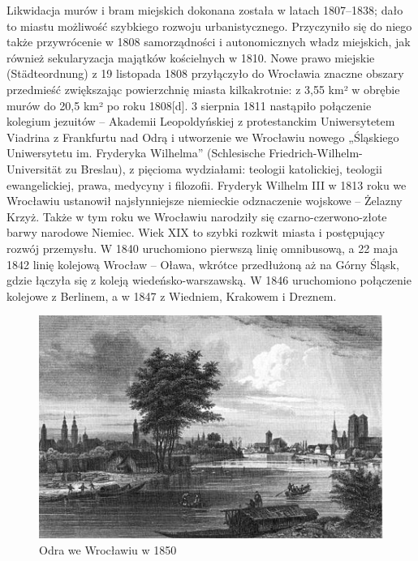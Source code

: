 \documentclass{article}
\begin{document}
Likwidacja murów i bram miejskich dokonana została w latach 1807–1838; dało to miastu możliwość szybkiego rozwoju urbanistycznego. Przyczyniło się do niego także przywrócenie w 1808 samorządności i autonomicznych władz miejskich, jak również sekularyzacja majątków kościelnych w 1810. Nowe prawo miejskie (Städteordnung) z 19 listopada 1808 przyłączyło do Wrocławia znaczne obszary przedmieść zwiększając powierzchnię miasta kilkakrotnie: z 3,55 km² w obrębie murów do 20,5 km² po roku 1808[d]. 3 sierpnia 1811 nastąpiło połączenie kolegium jezuitów – Akademii Leopoldyńskiej z protestanckim Uniwersytetem Viadrina z Frankfurtu nad Odrą i utworzenie we Wrocławiu nowego „Śląskiego Uniwersytetu im. Fryderyka Wilhelma” (Schlesische Friedrich-Wilhelm-Universität zu Breslau), z pięcioma wydziałami: teologii katolickiej, teologii ewangelickiej, prawa, medycyny i filozofii. Fryderyk Wilhelm III w 1813 roku we Wrocławiu ustanowił najsłynniejsze niemieckie odznaczenie wojskowe – Żelazny Krzyż. Także w tym roku we Wrocławiu narodziły się czarno-czerwono-złote barwy narodowe Niemiec. Wiek XIX to szybki rozkwit miasta i postępujący rozwój przemysłu. W 1840 uruchomiono pierwszą linię omnibusową, a 22 maja 1842 linię kolejową Wrocław – Oława, wkrótce przedłużoną aż na Górny Śląsk, gdzie łączyła się z koleją wiedeńsko-warszawską. W 1846 uruchomiono połączenie kolejowe z Berlinem, a w 1847 z Wiedniem, Krakowem i Dreznem.
 \begin{figure}[h!]
\centering
\includegraphics[scale=0.4]{8.jpg}
\caption{Odra we Wrocławiu w 1850}
\end{figure}
\end{document}
